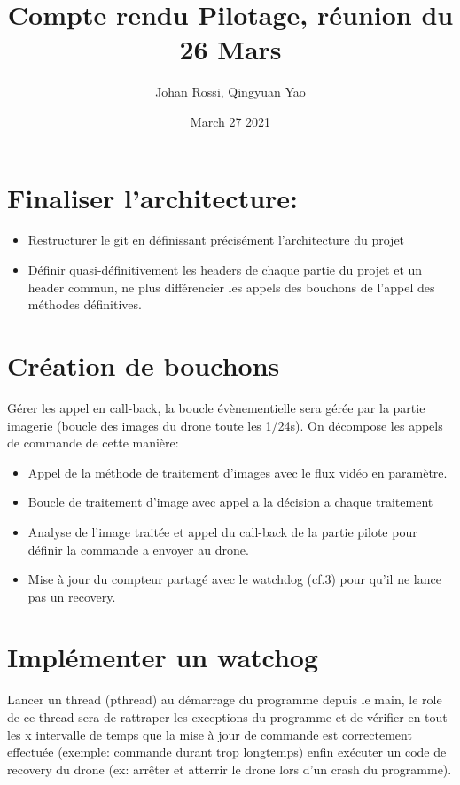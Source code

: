\documentclass{article}
\title{Compte rendu Pilotage, réunion du 26 Mars}
\author{Johan Rossi, Qingyuan Yao}
\date{March 27 2021}
\begin{document}
\maketitle

\section{Finaliser l'architecture:}
\begin{itemize}
    \item Restructurer le git en définissant précisément l'architecture du projet
    \item Définir quasi-définitivement les headers de chaque partie du projet et un header commun, ne plus différencier les appels des bouchons de l'appel des méthodes définitives.
\end{itemize}

\section{Création de bouchons}
Gérer les appel en call-back, la boucle évènementielle sera gérée par la partie imagerie (boucle des images du drone toute les 1/24s). 
On décompose les appels de commande de cette manière:
\begin{itemize}
    \item Appel de la méthode de traitement d'images avec le flux vidéo en paramètre.
    \item Boucle de traitement d'image avec appel a la décision a chaque traitement
    \item Analyse de l'image traitée et appel du call-back de la partie pilote pour définir la commande a envoyer au drone.
    \item Mise à jour du compteur partagé avec le watchdog (cf.3) pour qu'il ne lance pas un recovery.
\end{itemize}

\section{Implémenter un watchog}
Lancer un thread (pthread) au démarrage du programme depuis le main, le role de ce thread sera de rattraper les exceptions du programme et de vérifier en tout les x intervalle de temps que la mise à jour de commande est correctement effectuée (exemple: commande durant trop longtemps) enfin exécuter un code de recovery du drone (ex: arrêter et atterrir le drone lors d'un crash du programme).
\end{document}
